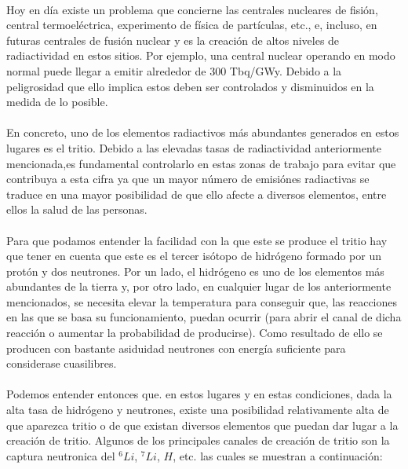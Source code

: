 \paragraph {}
Hoy en día existe un problema que concierne  las  centrales nucleares de fisión, central termoeléctrica,  experimento de física de partículas, etc., e, incluso, en futuras centrales de fusión nuclear y es la creación de altos niveles de radiactividad en estos sitios. Por ejemplo, una central nuclear operando en modo normal puede llegar a emitir alrededor de 300 Tbq/GWy.  Debido a la peligrosidad que ello implica estos deben ser controlados y disminuidos en la medida de lo posible.

\paragraph {}
En concreto, uno de los elementos radiactivos más abundantes generados en estos lugares es el tritio. Debido a las elevadas tasas de radiactividad anteriormente mencionada,es fundamental controlarlo en estas zonas de trabajo para evitar que contribuya a esta cifra ya que un mayor número de emisiónes radiactivas se traduce en una mayor posibilidad de que ello afecte a diversos elementos, entre ellos la salud de las personas.

\paragraph {}
Para que podamos entender la facilidad con la que este se produce el tritio hay que tener en cuenta que este es el tercer isótopo de hidrógeno formado por un protón y dos neutrones. Por un lado, el hidrógeno es uno de los elementos más abundantes de la tierra y, por otro lado, en cualquier lugar de los anteriormente mencionados, se necesita elevar la temperatura para conseguir que, las reacciones en las que se basa su funcionamiento, puedan ocurrir (para abrir el canal de dicha reacción o aumentar la probabilidad de producirse). Como resultado de ello se producen con bastante asiduidad neutrones con energía suficiente para considerase cuasilibres. 

\paragraph {}
Podemos entender entonces que. en estos lugares y en estas condiciones, dada la alta tasa de hidrógeno y neutrones, existe una posibilidad relativamente alta de que aparezca tritio o de que existan diversos elementos que puedan dar lugar a la creación de tritio. Algunos de los principales canales de creación de tritio son la captura neutronica del $^6Li$, $^7Li$, $H$, etc. las cuales se muestran a continuación:

